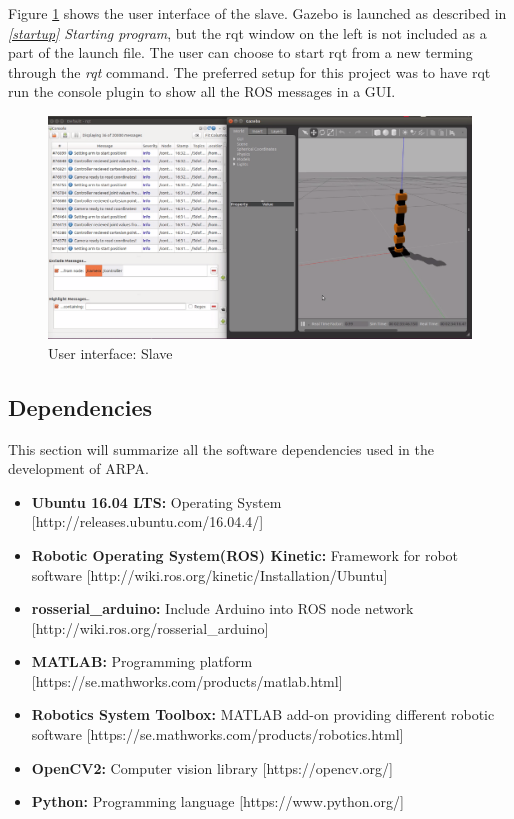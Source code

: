 \documentclass[11pt,a4paper, titlepage]{report}
\begin{document}
	Figure \ref{fig:ui-slave} shows the user interface of the slave. Gazebo is launched as described in \textit{\ref{startup} Starting program}, but the rqt window on the left is not included as a part of the launch file. The user can choose to start rqt from a new terming through the \textit{rqt} command. The preferred setup for this project was to have rqt run the console plugin to show all the ROS messages in a GUI.
	
	\begin{figure}[H]
		\centering
		\includegraphics[width=0.95\linewidth]{../Diagrams/UI-slave.png}
		\caption{User interface: Slave}
		\label{fig:ui-slave}
	\end{figure}
	
	\subsection{Dependencies}
	This section will summarize all the software dependencies used in the development of ARPA.
	\begin{itemize}
		\item \textbf{Ubuntu 16.04 LTS:} Operating System [http://releases.ubuntu.com/16.04.4/]
		\item \textbf{Robotic Operating System(ROS) Kinetic:} Framework for robot software [http://wiki.ros.org/kinetic/Installation/Ubuntu]
		\item \textbf{rosserial\_arduino:} Include Arduino into ROS node network [http://wiki.ros.org/rosserial\_arduino]
		\item \textbf{MATLAB:} Programming platform [https://se.mathworks.com/products/matlab.html]
		\item \textbf{Robotics System Toolbox:} MATLAB add-on providing different robotic software [https://se.mathworks.com/products/robotics.html]
		\item \textbf{OpenCV2:} Computer vision library [https://opencv.org/]
		\item \textbf{Python:} Programming language [https://www.python.org/]
	\end{itemize}
	
\end{document}

